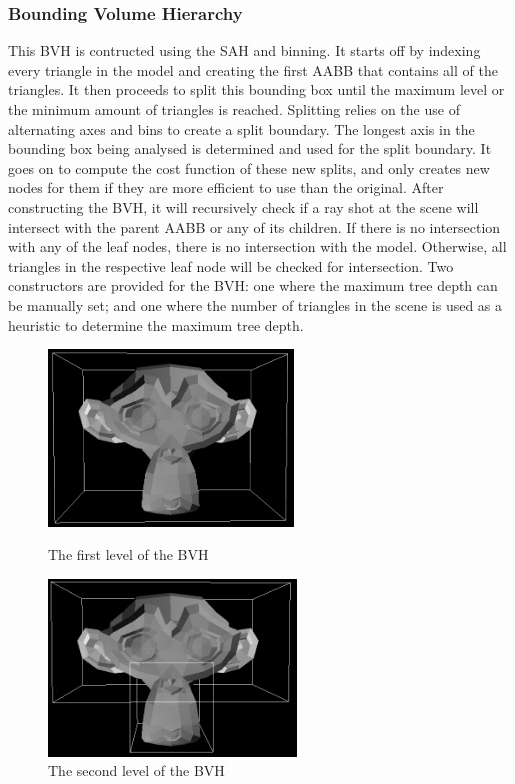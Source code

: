 \documentclass{article}
\begin{document}
    \newpage

    \subsubsection{Bounding Volume Hierarchy}
    This BVH is contructed using the SAH and binning. It starts off by indexing every triangle in the model 
    and creating the first AABB that contains all of the triangles. It then proceeds to split this bounding 
    box until the maximum level or the minimum amount of triangles is reached. Splitting relies on the use of 
    alternating axes and bins to create a split boundary. The longest axis in the bounding box being analysed 
    is determined and used for the split boundary. It goes on to compute the cost function of these new 
    splits, and only creates new nodes for them if they are more efficient to use than the original. After 
    constructing the BVH, it will recursively check if a ray shot at the scene will intersect with the parent 
    AABB or any of its children. If there is no intersection with any of the leaf nodes, there is no intersection 
    with the model. Otherwise, all triangles in the respective leaf node will be checked for intersection. Two 
    constructors are provided for the BVH: one where the maximum tree depth can be manually set; and one where 
    the number of triangles in the scene is used as a heuristic to determine the maximum tree depth.

    \begin{figure}[!htb]
          \includegraphics[width=\linewidth, height=4.7cm]{images/bvh_level_one}
          \caption*{The first level of the BVH}
        \endminipage\hfill
          \includegraphics[width=\linewidth, height=4.7cm]{images/bvh_level_two}
          \caption*{The second level of the BVH}
        \endminipage
      \end{figure}
      
\end{document}
